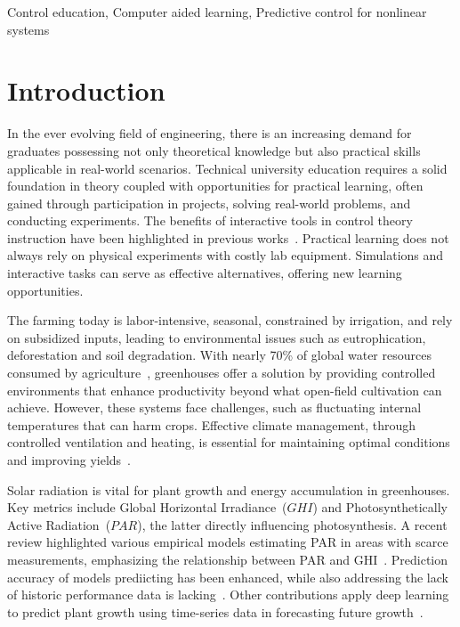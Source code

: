 \documentclass[conference]{IEEEtran}
\newcommand{\citep}{\cite}
\begin{document}
\begin{IEEEkeywords}
    Control education, Computer aided learning, Predictive control for nonlinear systems
\end{IEEEkeywords}

\section{Introduction}

In the ever evolving field of engineering, there is an increasing demand for graduates possessing not only theoretical knowledge but also practical skills applicable in real-world scenarios. Technical university education requires a solid foundation in theory coupled with opportunities for practical learning, often gained through participation in projects, solving real-world problems, and conducting experiments. The benefits of interactive tools in control theory instruction have been highlighted in previous works~\cite{Emami1991, Guzman2013}. Practical learning does not always rely on physical experiments with costly lab equipment. Simulations and interactive tasks can serve as effective alternatives, offering new learning opportunities.

The farming today is labor-intensive, seasonal, constrained by irrigation, and rely on subsidized inputs, leading to environmental issues such as eutrophication, deforestation and soil degradation. With nearly 70\% of global water resources consumed by agriculture~\cite{Debroy2024}, greenhouses offer a solution by providing controlled environments that enhance productivity beyond what open-field cultivation can achieve. However, these systems face challenges, such as fluctuating internal temperatures that can harm crops. Effective climate management, through controlled ventilation and heating, is essential for maintaining optimal conditions and improving yields~\cite{Wu2019}.

Solar radiation is vital for plant growth and energy accumulation in greenhouses. Key metrics include Global Horizontal Irradiance~(\(GHI\)) and Photosynthetically Active Radiation~(\(PAR\)), the latter directly influencing photosynthesis. A recent review highlighted various empirical models estimating PAR in areas with scarce measurements, emphasizing the relationship between PAR and GHI~\citep{NoriegaGardea2021}. Prediction accuracy of models prediicting has been enhanced, while also addressing the lack of historic performance data is lacking~\cite{Iddio2020, MaLu2022}. Other contributions apply deep learning to predict plant growth using time-series data in forecasting future growth~\cite{rs13030331}.
\end{document}
